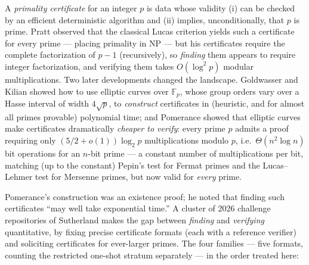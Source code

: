 \documentclass[11pt]{amsart}
\newcommand{\F}{\mathbb{F}}
\theoremstyle{plain}
\theoremstyle{definition}
\theoremstyle{remark}
\begin{document}
A \emph{primality certificate} for an integer $p$ is data whose validity (i) can be checked by an
efficient deterministic algorithm and (ii) implies, unconditionally, that $p$ is prime.
Pratt \cite{Pra75} observed that the classical Lucas criterion yields such a certificate for every prime
--- placing primality in NP --- but his certificates require the complete factorization of $p-1$
(recursively), so \emph{finding} them appears to require integer factorization, and verifying them takes
$O(\log^2 p)$ modular multiplications.  Two later developments changed the landscape.  Goldwasser and
Kilian \cite{GK86} showed how to use elliptic curves over $\F_p$, whose group orders vary over a Hasse
interval of width $4\sqrt p$, to \emph{construct} certificates in (heuristic, and for almost all primes
provable) polynomial time; and Pomerance \cite{Pom87} showed that elliptic curves make certificates
dramatically \emph{cheaper to verify}: every prime $p$ admits a proof requiring only
$(5/2+o(1))\log_2 p$ multiplications modulo $p$, i.e.\ $\Theta(n^2\log n)$ bit operations for an $n$-bit
prime --- a constant number of multiplications per bit, matching (up to the constant) Pepin's test for
Fermat primes and the Lucas--Lehmer test for Mersenne primes, but now valid for \emph{every} prime.

Pomerance's construction was an existence proof; he noted that finding such certificates ``may well take
exponential time.''  A cluster of 2026 challenge repositories of Sutherland
\cite{DANGER3,OneShot,Short} makes the gap between \emph{finding} and \emph{verifying} quantitative, by
fixing precise certificate formats (each with a reference verifier) and soliciting certificates for
ever-larger primes.  The four families --- five formats, counting the restricted one-shot stratum
separately --- in the order treated here:
\end{document}
